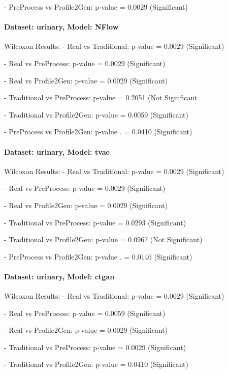 \documentclass{article}
\theoremstyle{plain}
\theoremstyle{definition}
\theoremstyle{remark}
\begin{document}
- PreProcess vs Profile2Gen: p-value = 0.0029 (Significant)



\paragraph{Dataset: urinary, Model: NFlow}
Wilcoxon Results:
- Real vs Traditional: p-value = 0.0029 (Significant)


- Real vs PreProcess: p-value = 0.0029 (Significant)


- Real vs Profile2Gen: p-value = 0.0029 (Significant)


- Traditional vs PreProcess: p-value = 0.2051 (Not Significant


- Traditional vs Profile2Gen: p-value = 0.0059 (Significant)


- PreProcess vs Profile2Gen: p-value . = 0.0410 (Significant)



\paragraph{Dataset: urinary, Model: tvae}
Wilcoxon Results:
- Real vs Traditional: p-value = 0.0029 (Significant)


- Real vs PreProcess: p-value = 0.0029 (Significant)


- Real vs Profile2Gen: p-value = 0.0029 (Significant)


- Traditional vs PreProcess: p-value = 0.0293 (Significant)


- Traditional vs Profile2Gen: p-value = 0.0967 (Not Significant)




- PreProcess vs Profile2Gen: p-value . = 0.0146 (Significant)



\paragraph{Dataset: urinary, Model: ctgan}
Wilcoxon Results:
- Real vs Traditional: p-value = 0.0029 (Significant)


- Real vs PreProcess: p-value = 0.0059 (Significant)


- Real vs Profile2Gen: p-value = 0.0029 (Significant)


- Traditional vs PreProcess: p-value = 0.0029 (Significant)


- Traditional vs Profile2Gen: p-value = 0.0410 (Significant)
\end{document}
